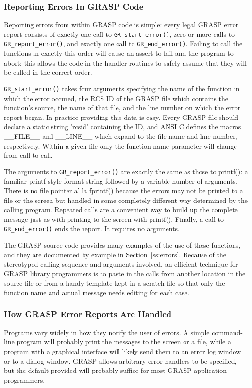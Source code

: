 \subsubsection{Reporting Errors In GRASP Code}

Reporting errors from within GRASP code is simple: every legal GRASP
error report consists of exactly one call to {\tt GR\_start\_error()},
zero or more calls to {\tt GR\_report\_error()}, and exactly one call
to {\tt GR\_end\_error()}.  Failing to call the functions in exactly
this order will cause an assert to fail and the program to abort; this
allows the code in the handler routines to safely assume that they will
be called in the correct order.

{\tt GR\_start\_error()} takes four arguments specifying the name of
the function in which the error occured, the RCS ID of the GRASP file
which contains the function's source, the name of that file, and the
line number on which the error report began.  In practice providing
this data is easy.  Every GRASP file should declare a static string
'rcsid' containing the ID, and ANSI C defines the macros \_\_FILE\_\_
and \_\_LINE\_\_ which expand to the file name and line number,
respectively.  Within a given file only the function name parameter
will change from call to call.

The arguments to {\tt GR\_report\_error()} are exactly the same as
those to printf(): a familiar printf-style format string followed by a
variable number of arguments.  There is no file pointer a' la fprintf()
because the errors may not be printed to a file or the screen but
handled in some completely different way determined by the calling
program.  Repeated calls are a convenient way to build up the complete
message just as with printing to the screen with printf().  Finally, a
call to {\tt GR\_end\_error()} ends the report.  It requires no
arguments.

The GRASP source code provides many examples of the use of these
functions, and they are documented by example in
Section~\ref{ss:errors}.  Because of the stereotyped calling sequence
and arguments involved, an efficient technique for GRASP library
programmers is to paste in the calls from another location in the
source file or from a handy template kept in a scratch file so that
only the function name and actual message needs editing for each case.


\subsubsection{How GRASP Error Reports Are Handled}
Programs vary widely in how they notify the user of errors.  A simple
command-line program will probably print the messages to the screen or
a file, while a program with a graphical interface will likely send
them to an error log window or to a dialog window.  GRASP allows
arbitrary error handlers to be specified, but the default provided will
probably suffice for most GRASP application programmers.

